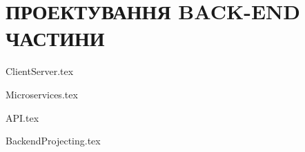 \section{ПРОЕКТУВАННЯ BACK-END ЧАСТИНИ}

{ClientServer.tex}

{Microservices.tex}

{API.tex}

{BackendProjecting.tex}
